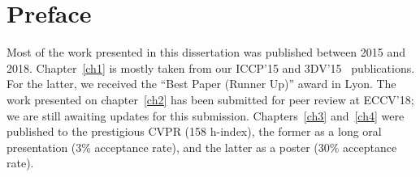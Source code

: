 \chapter*{Preface}         %

Most of the work presented in this dissertation was published between 2015 and 2018. Chapter~\ref{ch1} is mostly taken from our ICCP'15\cite{holdgeoffroy-iccp-15} and 3DV'15~\cite{holdgeoffroy-3dv-15} publications. For the latter, we received the ``Best Paper (Runner Up)'' award in Lyon. The work presented on chapter~\ref{ch2} has been submitted for peer review at ECCV'18; we are still awaiting updates for this submission. Chapters~\ref{ch3} and~\ref{ch4} were published to the prestigious CVPR (158 h-index), the former as a long oral presentation (3\% acceptance rate), and the latter as a poster (30\% acceptance rate).



